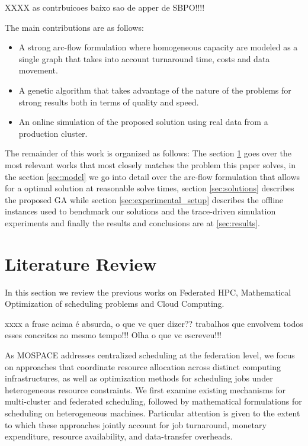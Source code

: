 \documentclass[conference]{IEEEtran}
\begin{document}
XXXX as contrbuicoes baixo sao de apper de SBPO!!!!

The main contributions are as follows:
\begin{itemize}
    \item A strong arc-flow formulation where homogeneous capacity are modeled as a single graph that takes into account turnaround time, costs and data movement.
    \item A genetic algorithm that takes advantage of the nature of the problems for strong results both in terms of quality and speed.
    \item An online simulation of the proposed solution using real data from a production cluster.
\end{itemize}

The remainder of this work is organized as follows: The section \ref{sec:related_work} goes over the most relevant works that most closely matches the problem this paper solves, in the section \ref{sec:model} we go into detail over the arc-flow formulation that allows for a optimal solution at reasonable solve times, section \ref{sec:solutions} describes the proposed GA while section \ref{sec:experimental_setup}
describes the offline instances used to benchmark our solutions and the trace-driven simulation experiments and finally the results and conclusions are at \ref{sec:results}.

\section{Literature Review}
\label{sec:related_work}

In this section we review the previous works on Federated HPC, Mathematical Optimization of scheduling problems and Cloud Computing.

xxxx a frase acima é absurda, o que vc quer dizer?? trabalhos que envolvem todos esses conceitos ao mesmo tempo!!! Olha o que vc escreveu!!!

As MOSPACE addresses centralized scheduling at the federation level, we focus on approaches that coordinate resource allocation across distinct computing infrastructures, as well as optimization methods for scheduling jobs under heterogeneous resource constraints. We first examine existing mechanisms for multi-cluster and federated scheduling, followed by  mathematical formulations for scheduling on heterogeneous machines. Particular attention is given to the extent to which these approaches jointly account for job turnaround, monetary expenditure, resource availability, and data-transfer overheads.
\end{document}
